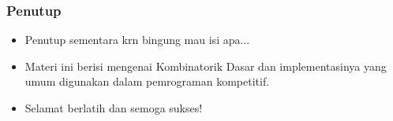 \begin{frame}
\frametitle{Penutup}
\begin{itemize}
  \item Penutup sementara krn bingung mau isi apa...
  \item Materi ini berisi mengenai Kombinatorik Dasar dan implementasinya yang umum digunakan dalam pemrograman kompetitif.
  \item Selamat berlatih dan semoga sukses!
\end{itemize}
\end{frame}


